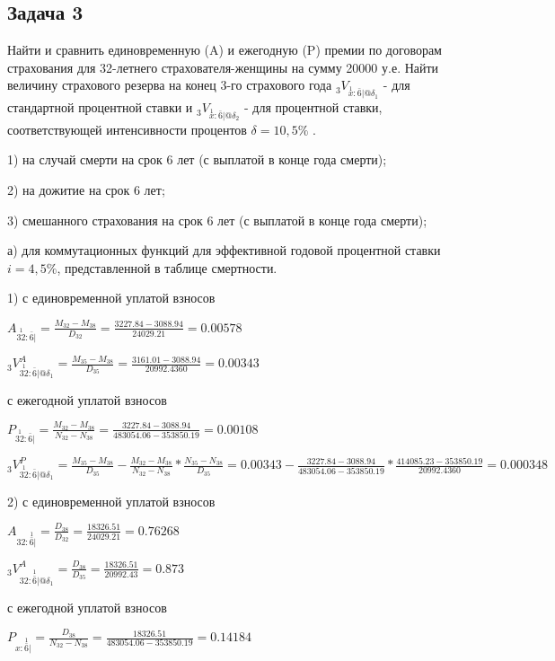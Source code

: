 \documentclass[12pt,a4paper, oneside]{extreport}
\begin{document}
\subsection*{Задача 3}

Найти и сравнить единовременную (A) и ежегодную (P) премии по договорам
страхования для 32-летнего страхователя-женщины на сумму 20000 у.е. Найти величину страхового резерва на конец 3-го страхового года  $_3V_{  \overset{1}{x} : \bar{6}|@\delta_1}$  - 
для  стандартной процентной ставки  и  $_3V_{  \overset{1}{x} : \bar{6}|@\delta_2}$ - для процентной ставки, 
соответствующей интенсивности процентов $\delta=10,5\%$ .


1) на случай смерти на срок 6 лет (с выплатой в конце года смерти);

2) на дожитие на срок 6 лет;

3) смешанного страхования на срок 6 лет (с выплатой в конце года смерти);

а) для коммутационных функций для эффективной годовой процентной ставки $i=4,5\%$, представленной в таблице смертности.

1) с единовременной уплатой взносов

 $ A_{  \overset{1}{32} : \bar{6}|} = \frac{M_{32}-M_{38}}{D_{32}} = \frac{3227.84-3088.94}{24029.21} = 0.00578$

$_3V_{  \overset{1}{32} : \bar{6}|@\delta_1}^A = \frac{M_{35}-M_{38}}{D_{35}} = \frac{3161.01-3088.94}{20992.4360} = 0.00343  $


с ежегодной уплатой взносов

 $ P_{ \overset{1}{32} : \bar{6}|} = \frac{M_{32}-M_{38}}{N_{32}-N_{38}} = \frac{3227.84 -3088.94}{483054.06- 353850.19} = 0.00108$

$_3V_{  \overset{1}{32} : \bar{6}|@\delta_1}^P =  \frac{M_{35}-M_{38}}{D_{35}}  -  \frac{M_{32}-M_{38}}{N_{32}-N_{38}} * \frac{N_{35}-N_{38}}{D_{35}}  = 0.00343  -  \frac{3227.84-3088.94}{483054.06-353850.19} * \frac{414085.23-353850.19}{20992.4360}  =  0.000348$



2) с единовременной уплатой взносов

$ A_{32:  \overset{1}{\bar{6}}|} = \frac{D_{38}}{D_{32}} = 
\frac{18326.51}{24029.21} = 0.76268$

$_3V_{  32:  \overset{1}{\bar{6}}|@\delta_1}^A = \frac{D_{38}}{D_{35}} =  \frac{18326.51}{20992.43} = 0.873  $

с ежегодной уплатой взносов


 $ P_{ x:  \overset{1}{\bar{6}}|} = \frac{D_{38}}{N_{32}-N_{38}}= \frac{18326.51}{483054.06 - 353850.19}= 0.14184$
\end{document}
